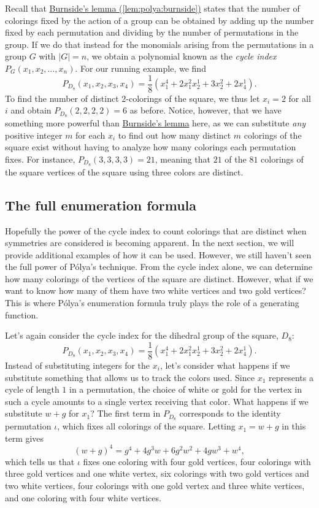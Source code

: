 Recall that \hyperref[lem:polya:burnside]{Burnside's lemma
  (\ref{lem:polya:burnside})} states that the number of colorings
fixed by the action of a group can be obtained by adding up the number
fixed by each permutation and dividing by the number of permutations
in the group. If we do that instead for the monomials arising from the
permutations in a group $G$ with $|G|=n$, we obtain a polynomial known
as the \emph{cycle index} $P_G(x_1,x_2,\dots,x_n)$. For our running
example, we find
\[P_{D_8}(x_1,x_2,x_3,x_4) = \frac{1}{8}\left(x_1^4 + 2x_1^2x_2^1 +
  3x_2^2 + 2x_4^1\right).\] To find the number of distinct
$2$-colorings of the square, we thus let $x_i=2$ for all $i$ and
obtain $P_{D_8}(2,2,2,2) = 6$ as before. Notice, however, that we have
something more powerful than \hyperref[lem:polya:burnside]{Burnside's
  lemma} here, as we can substitute \emph{any} positive integer $m$
for each $x_i$ to find out how many distinct $m$ colorings of the
square exist without having to analyze how many colorings each
permutation fixes. For instance, $P_{D_8}(3,3,3,3) = 21$, meaning that
$21$ of the $81$ colorings of the square vertices of the square using
three colors are distinct.

\subsection{The full enumeration formula}\label{ss:polya:polya:full}

Hopefully the power of the cycle index to count colorings that are
distinct when symmetries are considered is becoming apparent. In the
next section, we will provide additional examples of how it can be
used. However, we still haven't seen the full power of P\'olya's
technique. From the cycle index alone, we can determine how many
colorings of the vertices of the square are distinct. However, what if
we want to know how many of them have two white vertices and two gold
vertices? This is where P\'olya's enumeration formula truly plays the
role of a generating function.

Let's again consider the cycle index for the dihedral group of the
square, $D_8$:
\[P_{D_8}(x_1,x_2,x_3,x_4) = \frac{1}{8}\left(x_1^4 + 2x_1^2x_2^1 +
  3x_2^2 + 2x_4^1\right).\]
Instead of substituting integers for the $x_i$, let's consider what
happens if we substitute something that allows us to track the colors
used. Since $x_1$ represents a cycle of length $1$ in a permutation,
the choice of white or gold for the vertex in such a cycle amounts to
a single vertex receiving that color. What happens if we substitute
$w+g$ for $x_1$? The first term in $P_{D_8}$ corresponds to the
identity permutation $\iota$, which fixes all colorings of the
square. Letting $x_1=w+g$ in this term gives
\[(w+g)^4 = g^4+4 g^3 w+6 g^2 w^2+4 g w^3+w^4,\]
which tells us that $\iota$ fixes one coloring with four gold
vertices, four colorings with three gold vertices and one white
vertex, six colorings with two gold vertices and two white vertices,
four colorings with one gold vertex and three white vertices, and one
coloring with four white vertices.

